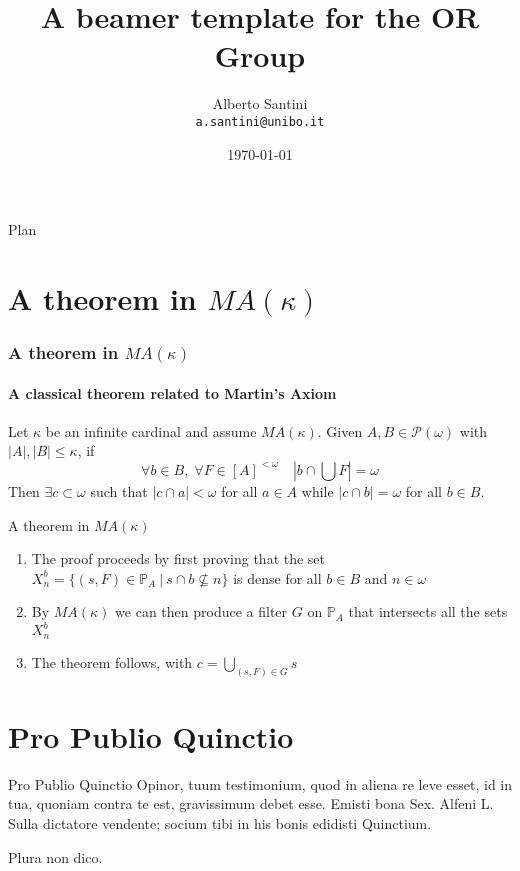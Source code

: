 \documentclass{beamer}
\title{A beamer template for the OR Group}
\date{\today}
\author[Alberto]{Alberto Santini\\\texttt{a.santini@unibo.it}}
\begin{document}
\begin{frame}
  \titlepage
\end{frame}

\begin{frame}{Plan}
  \tableofcontents
\end{frame}

\section{A theorem in $MA(\kappa)$}

\begin{frame} 
  \frametitle{A theorem in $MA(\kappa)$} 
  \framesubtitle{A classical theorem related to Martin's Axiom} 
  
  \begin{theorem}
    Let $\kappa$ be an infinite cardinal and assume $MA(\kappa)$. Given $A,B \in \mathcal{P}(\omega)$ with $|A|,|B| \leq \kappa$, if
    \begin{equation*}
      \forall b \in B, \; \forall F \in [A]^{<\omega} \quad \left| b \cap \bigcup F \right| = \omega
    \end{equation*}
    Then $\exists c \subset \omega$ such that $|c \cap a| < \omega$ for all $a \in A$ while $|c \cap b| = \omega$ for all $b \in B$.
  \end{theorem}
  
\end{frame}

\begin{frame}{A theorem in $MA(\kappa)$}
  \begin{enumerate} 
    \item<1-> The proof proceeds by first proving that the set $X^b_n = \{ (s, F) \in \mathbb{P}_A \ | \ s \cap b \not\subseteq n \}$ is dense for all $b \in B$ and $n \in \omega$
    \item<2-> By $MA(\kappa)$ we can then produce a filter $G$ on $\mathbb{P}_A$ that intersects all the sets $X^b_n$
    \item<3-> The theorem follows, with $c = \bigcup_{(s,F) \in G} s$
  \end{enumerate}
\end{frame}

\section{Pro Publio Quinctio}

\begin{frame}{Pro Publio Quinctio}
  Opinor, tuum testimonium, quod in aliena re leve esset, id in tua, quoniam contra te est, gravissimum debet esse. Emisti bona Sex. Alfeni L. Sulla dictatore vendente; socium tibi in his bonis edidisti Quinctium.
  \vspace{1em}
  \begin{center}
    \textcolor{unibored}{Plura non dico.}
  \end{center}
\end{frame}
\end{document}
